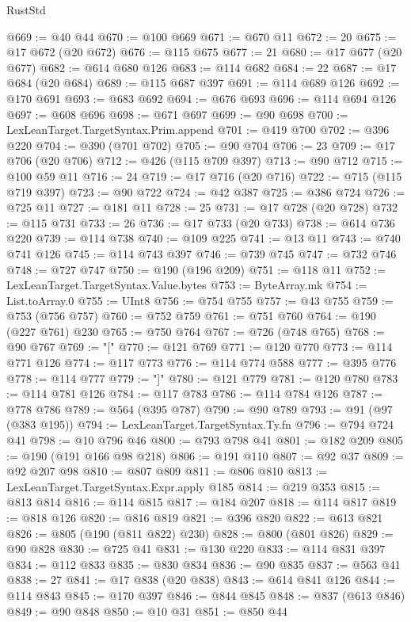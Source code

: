 \begin{lexlean}{RustStd}
\begin{coremodule}
@669 := @40 @44
@670 := @100 @669
@671 := @670 @11
@672 := 20
@675 := @17 @672 (@20 @672)
@676 := @115 @675
@677 := 21
@680 := @17 @677 (@20 @677)
@682 := @614 @680 @126
@683 := @114 @682
@684 := 22
@687 := @17 @684 (@20 @684)
@689 := @115 @687 @397
@691 := @114 @689 @126
@692 := @170 @691
@693 := @683 @692
@694 := @676 @693
@696 := @114 @694 @126
@697 := @608 @696
@698 := @671 @697
@699 := @90 @698
@700 := LexLeanTarget.TargetSyntax.Prim.append
@701 := @419 @700
@702 := @396 @220
@704 := @390 (@701 @702)
@705 := @90 @704
@706 := 23
@709 := @17 @706 (@20 @706)
@712 := @426 (@115 @709 @397)
@713 := @90 @712
@715 := @100 @59 @11
@716 := 24
@719 := @17 @716 (@20 @716)
@722 := @715 (@115 @719 @397)
@723 := @90 @722
@724 := @42 @387
@725 := @386 @724
@726 := @725 @11
@727 := @181 @11
@728 := 25
@731 := @17 @728 (@20 @728)
@732 := @115 @731
@733 := 26
@736 := @17 @733 (@20 @733)
@738 := @614 @736 @220
@739 := @114 @738
@740 := @109 @225
@741 := @13 @11
@743 := @740 @741 @126
@745 := @114 @743 @397
@746 := @739 @745
@747 := @732 @746
@748 := @727 @747
@750 := @190 (@196 @209)
@751 := @118 @11
@752 := LexLeanTarget.TargetSyntax.Value.bytes
@753 := ByteArray.mk
@754 := List.toArray.{0}
@755 := UInt8
@756 := @754 @755
@757 := @43 @755
@759 := @753 (@756 @757)
@760 := @752 @759
@761 := @751 @760
@764 := @190 (@227 @761) @230
@765 := @750 @764
@767 := @726 (@748 @765)
@768 := @90 @767
@769 := "["
@770 := @121 @769
@771 := @120 @770
@773 := @114 @771 @126
@774 := @117 @773
@776 := @114 @774 @588
@777 := @395 @776
@778 := @114 @777
@779 := "]"
@780 := @121 @779
@781 := @120 @780
@783 := @114 @781 @126
@784 := @117 @783
@786 := @114 @784 @126
@787 := @778 @786
@789 := @564 (@395 @787)
@790 := @90 @789
@793 := @91 (@97 (@383 @195))
@794 := LexLeanTarget.TargetSyntax.Ty.fn
@796 := @794 @724 @41
@798 := @10 @796 @46
@800 := @793 @798 @41
@801 := @182 @209
@805 := @190 (@191 @166 @98 @218)
@806 := @191 @110
@807 := @92 @37
@809 := @92 @207 @98
@810 := @807 @809
@811 := @806 @810
@813 := LexLeanTarget.TargetSyntax.Expr.apply @185
@814 := @219 @353
@815 := @813 @814
@816 := @114 @815
@817 := @184 @207
@818 := @114 @817
@819 := @818 @126
@820 := @816 @819
@821 := @396 @820
@822 := @613 @821
@826 := @805 (@190 (@811 @822) @230)
@828 := @800 (@801 @826)
@829 := @90 @828
@830 := @725 @41
@831 := @130 @220
@833 := @114 @831 @397
@834 := @112 @833
@835 := @830 @834
@836 := @90 @835
@837 := @563 @41
@838 := 27
@841 := @17 @838 (@20 @838)
@843 := @614 @841 @126
@844 := @114 @843
@845 := @170 @397
@846 := @844 @845
@848 := @837 (@613 @846)
@849 := @90 @848
@850 := @10 @31
@851 := @850 @44

\end{coremodule}
\end{lexlean}
